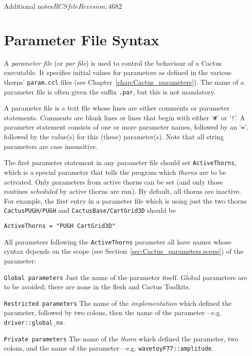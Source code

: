 \begin{cactuspart}{Additional notes}{$RCSfile$}{$Revision: 4682 $}
\section{Parameter File Syntax}
\label{sec:Parameter_File}

A \textit{parameter file} (or \textit{par file}) is used to control the
behaviour of a Cactus executable.  It specifies initial values for parameters
as defined in the various thorns' \texttt{param.ccl} files
(see Chapter~\ref{chap:Cactus_parameters}).
The name of a parameter file is often given the suffix \texttt{.par}, but
this is not mandatory.

A parameter file is a text file whose lines are either comments
or parameter statements.
Comments are blank lines or lines that begin with either
`\texttt{\#}' or `\texttt{!}'.
A parameter statement
consists of one or more parameter names, followed by
an `\texttt{=}', followed by the value(s) for this (these) parameter(s).
Note that all string parameters are case insensitive.

The first parameter statement in any parameter file should set \texttt{ActiveThorns},
which is a special parameter that tells the
program which \textit{thorns} are to be activated.  Only parameters from active
thorns can be set (and only those routines \textit{scheduled} by active thorns
are run).  By default, all thorns are inactive. For example, the first
entry in a parameter file which is using just the two thorns
\texttt{CactusPUGH/PUGH} and \texttt{CactusBase/CartGrid3D} should be

\texttt{ActiveThorns = "PUGH CartGrid3D"}

All parameters following the \texttt{ActiveThorns} parameter all have names
whose syntax depends on the scope
(see Section~\ref{sec:Cactus_parameters.scope})
of the parameter:
\begin{Lentry}
\item [\texttt{Global parameters}]
Just the name of the parameter itself. Global parameters are to be avoided;
there are none in the flesh and Cactus Toolkits.
\item [\texttt{Restricted parameters}]
The name of the \textit{implementation} which defined the parameter, followed
by two colons,
then the name of the parameter---e.g. \texttt{driver::global\_nx}.
\item [\texttt{Private parameters}]
The name of the \textit{thorn} which defined the parameter, two colons,
and the name of the parameter---e.g. \texttt{wavetoyF77::amplitude}.
\end{Lentry}


\end{cactuspart}
